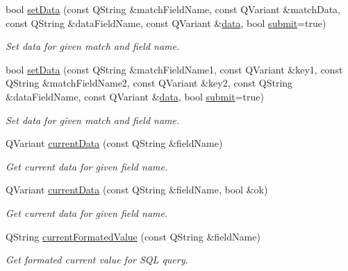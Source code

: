 \begin{DoxyCompactItemize}
bool \hyperlink{classmdt_abstract_sql_table_controller_a3e694e6dab9c883f1a276787a3723086}{set\-Data} (const Q\-String \&match\-Field\-Name, const Q\-Variant \&match\-Data, const Q\-String \&data\-Field\-Name, const Q\-Variant \&\hyperlink{classmdt_abstract_sql_table_controller_a1801a01c0ce073c2e389b20f58a3d3ff}{data}, bool \hyperlink{classmdt_abstract_sql_table_controller_a14f3e2a91fc30ca0e018944f4f95bc33}{submit}=true)
\begin{DoxyCompactList}\small\item\em Set data for given match and field name. \end{DoxyCompactList}\item 
bool \hyperlink{classmdt_abstract_sql_table_controller_a5ada88efd957fafc665feb050f278059}{set\-Data} (const Q\-String \&match\-Field\-Name1, const Q\-Variant \&key1, const Q\-String \&match\-Field\-Name2, const Q\-Variant \&key2, const Q\-String \&data\-Field\-Name, const Q\-Variant \&\hyperlink{classmdt_abstract_sql_table_controller_a1801a01c0ce073c2e389b20f58a3d3ff}{data}, bool \hyperlink{classmdt_abstract_sql_table_controller_a14f3e2a91fc30ca0e018944f4f95bc33}{submit}=true)
\begin{DoxyCompactList}\small\item\em Set data for given match and field name. \end{DoxyCompactList}\item 
Q\-Variant \hyperlink{classmdt_abstract_sql_table_controller_a055b69caef2670ea1ba6a5095167663f}{current\-Data} (const Q\-String \&field\-Name)
\begin{DoxyCompactList}\small\item\em Get current data for given field name. \end{DoxyCompactList}\item 
Q\-Variant \hyperlink{classmdt_abstract_sql_table_controller_a3477c9a155627cb08b660182a6ad6ff4}{current\-Data} (const Q\-String \&field\-Name, bool \&ok)
\begin{DoxyCompactList}\small\item\em Get current data for given field name. \end{DoxyCompactList}\item 
Q\-String \hyperlink{classmdt_abstract_sql_table_controller_a0af4c6d87f3d5b1ba7220c58e865dd1f}{current\-Formated\-Value} (const Q\-String \&field\-Name)
\begin{DoxyCompactList}\small\item\em Get formated current value for S\-Q\-L query. \end{DoxyCompactList}\item 

\end{DoxyCompactItemize}
